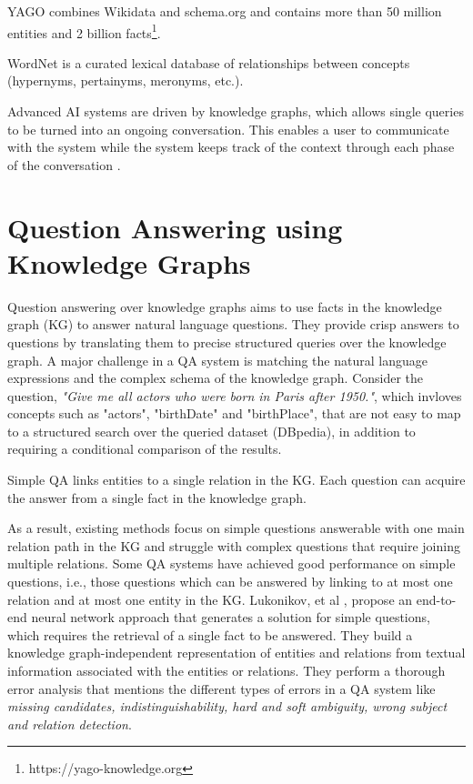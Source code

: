 YAGO combines Wikidata and schema.org and contains more than 50 million entities and 2 billion facts\footnote{https://yago-knowledge.org}. 

WordNet is a curated lexical database of relationships between concepts (hypernyms, pertainyms, meronyms, etc.).

Advanced AI systems are driven by knowledge graphs, which allows single queries to be turned into an ongoing conversation.
This enables a user to communicate with the system while the system keeps track of the context through each phase of the conversation \cite{Industry-Scale}.

\section{Question Answering using Knowledge Graphs}
Question answering over knowledge graphs aims to use facts in the knowledge graph (KG) to answer natural language questions. 
They provide crisp answers to questions by translating them to precise structured queries over the knowledge graph. A major challenge in a QA system is matching the natural language expressions and the complex schema of the knowledge graph. Consider the question, \textit{"Give me all actors who were born in Paris after 1950."}, which invloves concepts such as "actors", "birthDate" and "birthPlace", that are not easy to map to a structured search over the queried dataset (DBpedia), in addition to requiring a conditional comparison of the results. 

Simple QA links entities to a single relation in the KG. Each question
can acquire the answer from a single fact in the knowledge graph.

As a result, existing methods focus on simple questions answerable with one main relation path in the KG and struggle with complex questions that require joining multiple relations. 
Some QA systems have achieved good performance on simple questions, i.e., those questions which can be answered by linking to at most one relation and at most one entity in the KG. Lukonikov, et al \cite{10.1145/3038912.3052675}, propose an end-to-end neural network approach that generates a solution for simple questions, which requires the retrieval of a single fact to be answered. They build a knowledge graph-independent representation of entities and relations from textual information associated with the entities or relations. They perform a thorough error analysis that mentions the different types of errors in a QA system like \textit{missing candidates, indistinguishability, hard and soft ambiguity, wrong subject and relation detection}.

